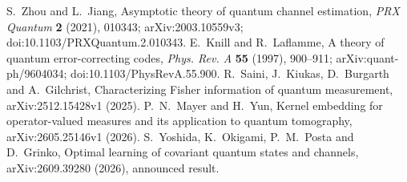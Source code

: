  S.~Zhou and L.~Jiang,
Asymptotic theory of quantum channel estimation,
\emph{PRX Quantum} \textbf{2} (2021), 010343;
arXiv:2003.10559v3; doi:10.1103/PRXQuantum.2.010343.
 E.~Knill and R.~Laflamme,
A theory of quantum error-correcting codes,
\emph{Phys. Rev. A} \textbf{55} (1997), 900--911;
arXiv:quant-ph/9604034; doi:10.1103/PhysRevA.55.900.
 R.~Saini, J.~Kiukas, D.~Burgarth and A.~Gilchrist,
Characterizing Fisher information of quantum measurement,
arXiv:2512.15428v1 (2025).
 P.~N.~Mayer and H.~Yun,
Kernel embedding for operator-valued measures and its application to
quantum tomography, arXiv:2605.25146v1 (2026).
 S.~Yoshida, K.~Okigami, P.~M.~Posta and D.~Grinko,
Optimal learning of covariant quantum states and channels,
arXiv:2609.39280 (2026), announced result.
